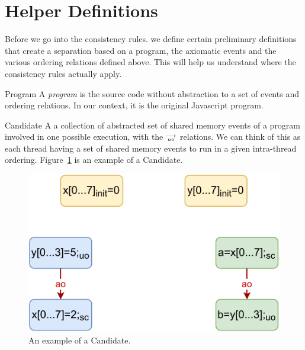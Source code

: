 \section{Helper Definitions}
    
    Before we go into the consistency rules. we define certain preliminary definitions that create a separation based on a program, the axiomatic events and the various ordering relations defined above. This will help us understand where the consistency rules actually apply.    
    
    \begin{definition}{Program} 
        A \emph{program} is the source code without abstraction to a set of events and ordering relations. In our context, it is the original Javascript program. 
        
    \end{definition}
    
    \begin{definition}{Candidate}
        A a collection of abstracted set of shared memory events of a program involved in one possible execution, with the $\stackrel{\longrightarrow}{_\textit{ao}}$ relations. 
        We can think of this as each thread having a set of shared memory events to run in a given intra-thread ordering. 
        Figure~\ref{model:candidate} is an example of a Candidate.
        \begin{figure}[H]
            \centering
            \includegraphics[scale=0.7]{4.ECMAScriptMemoryModel/candidate.pdf}
            \caption{An example of a Candidate.}
            \label{model:candidate}
        \end{figure}
        
    \end{definition}

